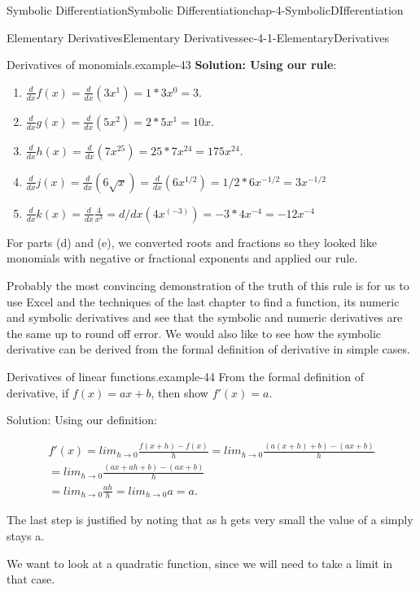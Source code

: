 \documentclass[oneside,10pt,]{book}
\newcommand{\terminology}[1]{\textbf{#1}}
\numberwithin{equation}{section}
\begin{document}
\begin{chapterptx}{Symbolic Differentiation}{}{Symbolic Differentiation}{}{}{chap-4-SymbolicDIfferentiation}
\begin{sectionptx}{Elementary Derivatives}{}{Elementary Derivatives}{}{}{sec-4-1-ElementaryDerivatives}
\begin{example}{Derivatives of monomials.}{example-43}
\terminology{Solution: Using our rule}:%
\leavevmode%
\begin{enumerate}[label=(\alph*)]
\item\hypertarget{li-454}{}\(\frac{d}{dx} f(x)=  \frac{d}{dx} (3 x^1)=1*3 x^0=3.\)%
\item\hypertarget{li-455}{}\(\frac{d}{dx} g(x)=\frac{d}{dx}  (5 x^2 )=2*5 x^1=10 x.\)%
\item\hypertarget{li-456}{}\(\frac{d}{dx} h(x)=\frac{d}{dx} (7x^{25})=25*7 x^24=175x^{24}.\)%
\item\hypertarget{li-457}{}\(\frac{d}{dx} j(x)=\frac{d}{dx}  (6 \sqrt{x})=\frac{d}{dx}  (6x^{1/2} )=1/2*6x^{-1/2}=3x^{-1/2}\)%
\item\hypertarget{li-458}{}\(\frac{d}{dx}  k(x)=\frac{d}{dx}  \frac{4 }{x^3 }=d/dx (4 x^{(-3)} )=-3*4 x^{-4}=-12 x^{-4}\)%
\end{enumerate}
\end{example}
\hypertarget{p-1432}{}%
For parts (d) and (e), we converted roots and fractions so they looked like monomials with negative or fractional exponents and applied our rule.%
\par
\hypertarget{p-1433}{}%
Probably the most convincing demonstration of the truth of this rule is for us to use Excel and the techniques of the last chapter to find a function, its numeric and symbolic derivatives and see that the symbolic and numeric derivatives are the same up to round off error.  We would also like to see how the symbolic derivative can be derived from the formal definition of derivative in simple cases.%
\begin{example}{Derivatives of linear functions.}{example-44}%
\hypertarget{p-1434}{}%
From the formal definition of derivative, if \(f(x)=a x+b\), then show \(f'(x)=a\).%
\par
\hypertarget{p-1435}{}%
Solution: Using our definition:%
\par
\hypertarget{p-1436}{}%
%
\begin{gather*}
f'(x)=lim_{h\to0}\frac{f(x+h)-f(x)}{h}
=lim_{h\to0}\frac{(a (x+h)+b)-(a x+b)}{h}\\
=lim_{h\to0}\frac{(a x+a h+b)-(a x+b)}{h}\\
=lim_{h\to0}\frac{ah}{h}  =lim_{h\to0}a=a.
\end{gather*}
%
\par
\hypertarget{p-1437}{}%
The last step is justified by noting that as h gets very small the value of a simply stays a.%
\end{example}
\hypertarget{p-1438}{}%
We want to look at a quadratic function, since we will need to take a limit in that case.%

\end{sectionptx}
\end{chapterptx}
\end{document}

